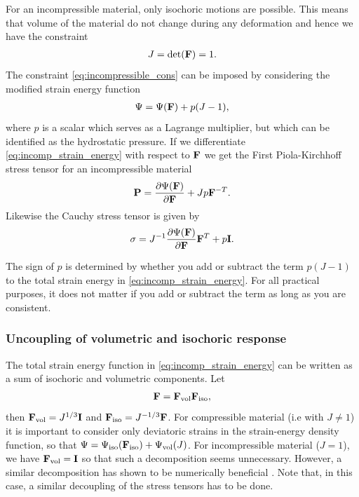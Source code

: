 For an incompressible material, only isochoric motions are
possible. This means that volume of the material do not change during
any deformation and hence we have the constraint 
\begin{align}
  J = \det(\mathbf{F}) = 1.
  \label{eq:incompressible_cons}
\end{align}
The constraint \eqref{eq:incompressible_cons} can be imposed by
considering the modified strain energy function
\begin{align}
  \Psi = \Psi(\mathbf{F}) + p(J-1),
  \label{eq:incomp_strain_energy}
\end{align}
where $p$ is a scalar which serves as a Lagrange multiplier, but which
can be identified as the hydrostatic pressure. If we differentiate
\eqref{eq:incomp_strain_energy} with respect to $\mathbf{F}$ we get the First
Piola-Kirchhoff stress tensor for an incompressible material
\begin{align}
  \mathbf{P} = \frac{\partial \Psi(\mathbf{F})}{\partial \mathbf{F}} + J p \mathbf{F}^{-T}.
\end{align}
Likewise the Cauchy stress tensor is given by
\begin{align}
  \mathbf{\sigma} = J^{-1} \frac{\partial \Psi(\mathbf{F})}{\partial \mathbf{F}}\mathbf{F}^{T} + p \mathbf{I}.
  \label{eq:cauchy_incomp}
\end{align}


\begin{remark}
  The sign of $p$ is determined by whether you add or subtract the term
  $ p(J-1)$ to the total strain energy in
  \eqref{eq:incomp_strain_energy}. For all practical purposes, it
  does not matter if you add or subtract the term as long as you are
  consistent. 
\end{remark}


\subsubsection{Uncoupling of volumetric and isochoric response}
The total strain energy function in \eqref{eq:incomp_strain_energy}
can be written as a sum of isochoric and volumetric components. Let
\begin{align}
  \mathbf{F} =  \mathbf{F}_{\mathrm{vol}} \mathbf{F}_{\mathrm{iso}},
\end{align}
then $ \mathbf{F}_{\mathrm{vol}} =
J^{1/3}\mathbf{I}$ and $\mathbf{F}_{\mathrm{iso}} = J^{-1/3}\mathbf{F}$. For
compressible material (i.e with $J \neq 1$) it is important to consider
only deviatoric strains in the strain-energy density function, so that
$\Psi = \Psi_{\mathrm{iso}}(\mathbf{F}_{\mathrm{iso}}) +
\Psi_{\mathrm{vol}}(J)$. For incompressible material ($J = 1$), we
have $\mathbf{F}_{\mathrm{vol}} = \mathbf{I}$ so that such a decomposition seems
unnecessary. However, a similar decomposition has shown to be
numerically beneficial \cite{weiss1996finite}. Note that, in this case, a similar
decoupling of the stress tensors has to be done.

